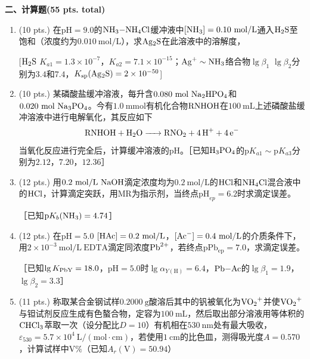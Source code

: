 \vspace{0.5cm}
\noindent\textbf{二、计算题(55 pts. total)}

\begin{enumerate}[label=\arabic*., itemsep=1.5ex]
    \item (10 pts.) 在$\mathrm{pH}=9.0$的$\ce{NH3-NH4Cl}$缓冲液中$[\ce{NH3}]=0.10\ \mathrm{mol/L}$通入$\ce{H2S}$至饱和（浓度约为$0.010\ \mathrm{mol/L}$），求$\ce{Ag2S}$在此溶液中的溶解度，
    
    [$\ce{H2S}$ $K_{a1}=1.3\times10^{-7}$，$K_{a2}=7.1\times10^{-15}$；$\ce{Ag^+} \sim \ce{NH3}$络合物$\lg\beta_1$ $\lg\beta_2$分别为$3.4$和$7.4$，$K_{\mathrm{sp}}(\ce{Ag2S})=2\times10^{-50}$]
    \item (10 pts.) 某磷酸盐缓冲溶液，每升含$0.080\ \mathrm{mol}\ \ce{Na2HPO4}$和$0.020\ \mathrm{mol}\ \ce{Na3PO4}$。今有$1.0\ \mathrm{mmol}$有机化合物$\ce{RNHOH}$在$100\ \mathrm{mL}$上述磷酸盐缓冲溶液中进行电解氧化，其反应如下
    \[
    \ce{RNHOH + H2O -> RNO2 + 4H+ + 4e^-}
    \]
    当氧化反应进行完全后，计算缓冲溶液的$\mathrm{pH}$。［已知$\ce{H3PO4}$的$\mathrm{p}K_{a1} \sim \mathrm{p}K_{a3}$分别为$2.12$，$7.20$，$12.36$］
    \item (12 pts.) 用$0.2\ \mathrm{mol/L}\ \ce{NaOH}$滴定浓度均为$0.2\ \mathrm{mol/L}$的$\ce{HCl}$和$\ce{NH4Cl}$混合液中的$\ce{HCl}$，计算滴定突跃，用$\mathrm{MR}$为指示剂，当终点$\mathrm{pH}_{ep}=6.2$时求滴定误差。
    
    ［已知$\mathrm{p}K_b(\ce{NH3})=4.74$］
    \item (12 pts.) 在$\mathrm{pH}=5.0$ $[\ce{HAc}]=0.2\ \mathrm{mol/L}$，$[\ce{Ac^-}]=0.4\ \mathrm{mol/L}$的介质条件下，用$2\times10^{-3}\ \mathrm{mol/L}\ \mathrm{EDTA}$滴定同浓度$\ce{Pb^{2+}}$，若终点$\mathrm{pPb_{ep}}=7.0$，求滴定误差。
    
    ［已知$\lg K_{\ce{PbY}}=18.0$，$\mathrm{pH}=5.0$时$\lg\alpha_{Y(\mathrm{H})}=6.4$，$\ce{Pb-Ac}$的$\lg\beta_1=1.9$，$\lg\beta_2=3.3$］
    \item (11 pts.) 称取某合金钢试样$0.2000\ \mathrm{g}$酸溶后其中的钒被氧化为$\ce{VO_2^+}$并使$\ce{VO_2^+}$与钽试剂反应生成有色螯合物，定容为$100\ \mathrm{mL}$，然后取出部分溶液用等体积的$\ce{CHCl3}$萃取一次（设分配比$D=10$）有机相在$530\ \mathrm{nm}$处有最大吸收，$\varepsilon_{530}=5.7\times10^4\ \mathrm{L/(mol\cdot cm)}$，若使用$1\ \mathrm{cm}$的比色皿，测得吸光度$A=0.570$，计算试样中$\mathrm{V\%}$（已知$A_r(\mathrm{V})=50.94$）
\end{enumerate}